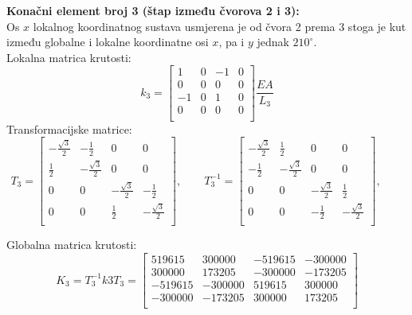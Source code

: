 \documentclass[a4paper,twoside,12pt]{memoir} %
\begin{document}
\textbf{Konačni element broj 3 (štap između čvorova 2 i 3):} \\
Os $x$ lokalnog koordinatnog sustava usmjerena je od čvora 2 prema 3 stoga je kut između globalne i lokalne koordinatne osi $x$, pa i $y$ jednak $210^\circ$. \\
Lokalna matrica krutosti:
\begin{equation}
    k_3 = 
    \begin{bmatrix}
    1 & 0 & -1 & 0 \\
    0 & 0 & 0 & 0 \\
    -1 & 0 & 1 & 0 \\
    0 & 0 & 0 & 0 \\
    \end{bmatrix}  \frac{E  A}{L_3}
\end{equation}
Transformacijske matrice:
\begin{equation}
    T_3 =
    \begin{bmatrix}
    -\frac{\sqrt{3}}{2} & -\frac{1}{2} & 0 & 0 \\
    \frac{1}{2} & -\frac{\sqrt{3}}{2} & 0 & 0 \\
    0 & 0 & -\frac{\sqrt{3}}{2} & -\frac{1}{2} \\
    0 & 0 & \frac{1}{2} & -\frac{\sqrt{3}}{2} \\
    \end{bmatrix}, \qquad
    T^{-1}_3 =
    \begin{bmatrix}
    -\frac{\sqrt{3}}{2} & \frac{1}{2} & 0 & 0 \\
    -\frac{1}{2} & -\frac{\sqrt{3}}{2} & 0 & 0 \\
    0 & 0 & -\frac{\sqrt{3}}{2} & \frac{1}{2} \\
    0 & 0 & -\frac{1}{2} & -\frac{\sqrt{3}}{2} \\
    \end{bmatrix}, \qquad
\end{equation}

Globalna matrica krutosti:
\begin{equation}
    K_3 = T^{-1}_3  k3  T_3 =
    \begin{bmatrix}
    519615 & 300000 & -519615 & -300000 \\
    300000 & 173205 & -300000 & -173205 \\
    -519615 & -300000 & 519615 & 300000 \\
    -300000 & -173205 & 300000 & 173205 \\
    \end{bmatrix}
\end{equation}
\end{document}
